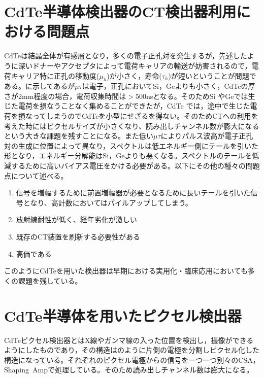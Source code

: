\section{CdTe半導体検出器のCT検出器利用における問題点}

CdTeは結晶全体が有感層となり，多くの電子正孔対を発生するが，先述したように深いドナーやアクセプタによって電荷キャリアの輸送が妨害されるので，電荷キャリア特に正孔の移動度($\mu_h$)が小さく，寿命($\tau_h$)が短いということが問題である。に示してあるが$\mu\tau$は電子，正孔においてSi，Geよりも小さく，CdTeの厚さが2mm程度の場合，電荷収集時間は$>500$nsとなる。そのためSi やGeでは生じた電荷を損なうことなく集めることができたが，CdTe では，途中で生じた電荷を損なってしまうのでCdTeを小型にせざるを得ない。そのためCTへの利用を考えた時にはピクセルサイズが小さくなり、読み出しチャンネル数が膨大になるという大きな課題を残すことになる。また低い$\mu\tau$によりパルス波高が電子正孔対の生成に位置によって異なり，スペクトルは低エネルギー側にテールを引いた形となり，エネルギー分解能はSi，Geよりも悪くなる。スペクトルのテールを低減するために高いバイアス電圧をかける必要がある。以下にその他の種々の問題点について述べる。

\begin{enumerate}
\item 信号を増幅するために前置増幅器が必要となるために長いテールを引いた信号となり、高計数においてはパイルアップしてしまう。
\item 放射線耐性が低く、経年劣化が激しい
\item 既存のCT装置を刷新する必要性がある
\item 高価である
\end{enumerate}
このようにCdTeを用いた検出器は早期における実用化・臨床応用においても多くの課題を残している。

%

\section{CdTe半導体を用いたピクセル検出器}
CdTeピクセル検出器とはX線やガンマ線の入った位置を検出し，撮像ができるようにしたものであり，その構造はのように片側の電極を分割しピクセル化した構造になっている。それぞれのピクセル電極からの信号を一つ一つ別々のCSA，Shaping\ Ampで処理している。そのため読み出しチャンネル数は膨大になる。

